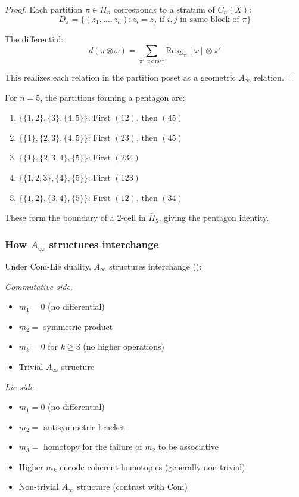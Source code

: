 \begin{proof}
Each partition $\pi \in \Pi_n$ corresponds to a stratum of $\overline{C}_n(X)$:
\[D_\pi = \{(z_1, \ldots, z_n) : z_i = z_j \text{ if } i,j \text{ in same block of } \pi\}\]

The differential:
\[d(\pi \otimes \omega) = \sum_{\pi' \text{ coarser}} \text{Res}_{D_{\pi'}}[\omega] \otimes \pi'\]

This realizes each relation in the partition poset as a geometric $A_\infty$ relation.
\end{proof}

\begin{example}
For $n=5$, the partitions forming a pentagon are:
\begin{enumerate}
\item $\{\{1,2\},\{3\},\{4,5\}\}$: First $(12)$, then $(45)$
\item $\{\{1\},\{2,3\},\{4,5\}\}$: First $(23)$, then $(45)$
\item $\{\{1\},\{2,3,4\},\{5\}\}$: First $(234)$
\item $\{\{1,2,3\},\{4\},\{5\}\}$: First $(123)$
\item $\{\{1,2\},\{3,4\},\{5\}\}$: First $(12)$, then $(34)$
\end{enumerate}

These form the boundary of a 2-cell in $\bar{\Pi}_5$, giving the pentagon identity.
\end{example}

\subsubsection{\texorpdfstring{How $A_\infty$ structures interchange}{How A-infinity structures interchange}}

\begin{theorem}\label{thm:ainfty-com-lie-interchange}
Under Com-Lie duality, $A_\infty$ structures interchange
\textup{(}\cite[Theorem~7.4.1]{LV12}\textup{)}:

\emph{Commutative side.}
\begin{itemize}
\item $m_1 = 0$ (no differential)
\item $m_2 = $ symmetric product
\item $m_k = 0$ for $k \geq 3$ (no higher operations)
\item Trivial $A_\infty$ structure
\end{itemize}

\emph{Lie side.}
\begin{itemize}
\item $m_1 = 0$ (no differential)
\item $m_2 = $ antisymmetric bracket
\item $m_3 = $ homotopy for the failure of $m_2$ to be associative
\item Higher $m_k$ encode coherent homotopies (generally non-trivial)
\item Non-trivial $A_\infty$ structure (contrast with Com)
\end{itemize}
\end{theorem}

